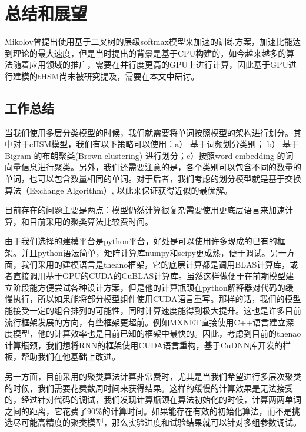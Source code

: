 \chapter{总结和展望}
Mikolov曾提出使用基于二叉树的层级softmax模型来加速的训练方案，加速比能达到理论的最大速度，但是当时提出的背景是基于CPU构建的，如今越来越多的算法随着应用领域的推广，需要在并行度更高的GPU上进行计算，因此基于GPU进行建模的tHSM尚未被研究提及，需要在本文中研讨。
\section{工作总结}
当我们使用多层分类模型的时候，我们就需要将单词按照模型的架构进行划分。其中对于cHSM模型，我们有以下策略可以使用：a） 基于词频划分类别； b） 基于Bigram 的布朗聚类(Brown clustering) 进行划分；c）按照word-embedding 的词向量信息进行聚类。另外，我们还需要注意的是，各个类别可以包含不同的数量的单词，也可以包含数量相同的单词。对于后者，我们考虑的划分模型就是基于交换算法（Exchange Algorithm）, 以此来保证获得近似的最优解。


目前存在的问题主要是两点：模型仍然计算很复杂需要使用更底层语言来加速计算，和目前采用的聚类算法比较费时间。

由于我们选择的建模平台是python平台，好处是可以使用许多现成的已有的框架。并且python语法简单，矩阵计算库numpy和scipy更成熟，便于调试。另一方面，我们采用的建模语言是theano框架，它的底层计算都是调用BLAS计算库，或者直接调用基于GPU的CUDA的CuBLAS计算库。虽然这样做便于在前期模型建立阶段能方便尝试各种设计方案，但是他的计算瓶颈在python解释器对代码的缓慢执行，所以如果能将部分模型组件使用CUDA语言重写。那样的话，我们的模型能接受一定的组合排列的可能性，同时计算速度能得到极大提升。这也是许多目前流行框架发展的方向，有些框架更超前。例如MXNET直接使用C++语言建立深度模型，他的计算效率也是目前已知的框架中最快的。因此，考虑到目前的thenao计算瓶颈，我们想将RNN的框架使用CUDA语言重构，基于CuDNN库开发的样板，帮助我们在他基础上改进。

另一方面，目前采用的聚类算法计算非常费时，尤其是当我们希望进行多层次聚类的时候，我们需要花费数周时间来获得结果。这样的缓慢的计算效果是无法接受的，经过针对代码的调试，我们发现计算瓶颈在算法初始化的时候，计算两两单词之间的距离，它花费了90\%的计算时间。如果能存在有效的初始化算法，而不是挑选尽可能高精度的聚类模型，那么实验进度和试验结果就可以针对多组参数调试。
